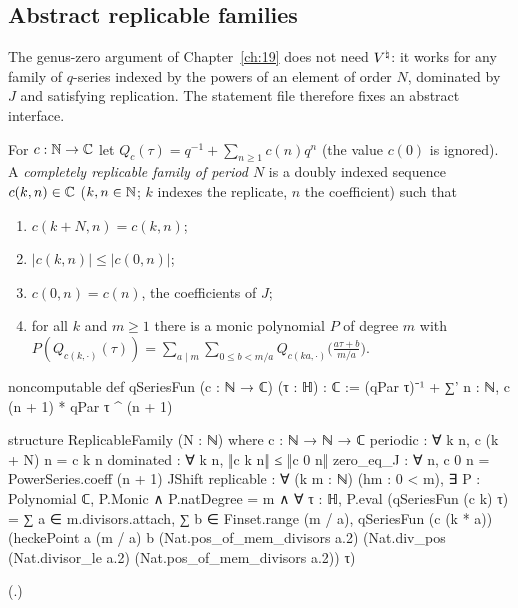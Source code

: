 \subsection{Abstract replicable families}

The genus-zero argument of Chapter~\ref{ch:19} does not need ${V^{\natural}}$: it works for any family of $q$-series indexed by
the powers of an element of order $N$, dominated by $J$ and satisfying replication.  The statement file therefore
fixes an abstract interface.

\begin{definition}\label{ch16:def:family}
For $c:{\mathbb{N}}\to{\mathbb{C}}$ let $Q_c(\tau)=q^{-1}+\sum_{n\ge1}c(n)q^n$ (the value $c(0)$ is ignored).  A \emph{completely replicable
family of period $N$} is a doubly indexed sequence $c(k,n)\in{\mathbb{C}}$ ($k,n\in{\mathbb{N}}$; $k$ indexes the replicate, $n$ the
coefficient) such that
\begin{enumerate}[label=(\roman*)]
\item $c(k+N,n)=c(k,n)$;
\item $|c(k,n)|\le|c(0,n)|$;
\item $c(0,n)=c(n)$, the coefficients of $J$;
\item for all $k$ and $m\ge1$ there is a monic polynomial $P$ of degree $m$ with
  $P(Q_{c(k,\cdot)}(\tau))=\sum_{a\mid m}\sum_{0\le b<m/a}Q_{c(ka,\cdot)}\bigl(\frac{a\tau+b}{m/a}\bigr)$.
\end{enumerate}
\end{definition}
\begin{leancode}
noncomputable def qSeriesFun (c : ℕ → ℂ) (τ : ℍ) : ℂ :=
  (qPar τ)⁻¹ + ∑' n : ℕ, c (n + 1) * qPar τ ^ (n + 1)

structure ReplicableFamily (N : ℕ) where
  c : ℕ → ℕ → ℂ
  periodic : ∀ k n, c (k + N) n = c k n
  dominated : ∀ k n, ‖c k n‖ ≤ ‖c 0 n‖
  zero_eq_J : ∀ n, c 0 n = PowerSeries.coeff (n + 1) JShift
  replicable : ∀ (k m : ℕ) (hm : 0 < m), ∃ P : Polynomial ℂ, P.Monic ∧ P.natDegree = m ∧
    ∀ τ : ℍ, P.eval (qSeriesFun (c k) τ) =
      ∑ a ∈ m.divisors.attach, ∑ b ∈ Finset.range (m / a),
        qSeriesFun (c (k * a)) (heckePoint a (m / a) b (Nat.pos_of_mem_divisors a.2)
          (Nat.div_pos (Nat.divisor_le a.2) (Nat.pos_of_mem_divisors a.2)) τ)
\end{leancode}
(.)

